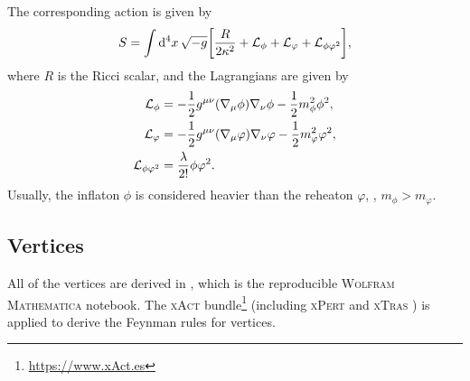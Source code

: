 \documentclass{article}
\begin{document}
        The corresponding action is given by
        \begin{equation}
            S = \int \dd[4]{x} \sqrt{-g} \qty[\frac{R}{2 \kappa^2} + \mathcal{L}_\phi + \mathcal{L}_\varphi + \mathcal{L}_{\phi\varphi^2}],
        \end{equation}
        where $R$ is the Ricci scalar, and the Lagrangians are given by
        \begin{align}
            \mathcal{L}_\phi & = -\frac{1}{2} g^{\mu\nu} \qty(\nabla_\mu \phi) \nabla_\nu \phi - \frac{1}{2} m_\phi^2 \phi^2, \\
            \mathcal{L}_\varphi & = -\frac{1}{2} g^{\mu\nu} \qty(\nabla_\mu \varphi) \nabla_\nu \varphi - \frac{1}{2} m_\varphi^2 \varphi^2, \\
            \mathcal{L}_{\phi\varphi^2} & = \frac{\lambda}{2!} \phi \varphi^2.
        \end{align}
        Usually, the inflaton $\phi$ is considered heavier than the reheaton $\varphi$, \ie, $m_\phi > m_\varphi$.

        \subsection{Vertices}

            All of the vertices are derived in , which is the reproducible \textsc{Wolfram Mathematica} notebook.
            The \textsc{xAct} bundle\footnote{\url{https://www.xAct.es}} (including \textsc{xPert} \cite{Brizuela:2008ra} and \textsc{xTras} \cite{Nutma:2013zea}) is applied to derive the Feynman rules for vertices.
\end{document}
